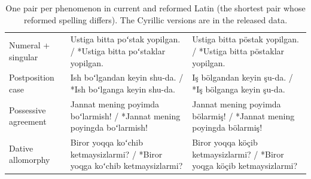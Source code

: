 \begin{table}[t]
\begin{tabular}{lp{6.6cm}p{6.6cm}}
Numeral + singular & Ustiga bitta poʻstak yopilgan. / *Ustiga bitta poʻstaklar yopilgan. & Ustiga bitta pöstak yopilgan. / *Ustiga bitta pöstaklar yopilgan. \\
Postposition case & Ish boʻlgandan keyin shu-da. / *Ish boʻlganga keyin shu-da. & Iş bölgandan keyin şu-da. / *Iş bölganga keyin şu-da. \\
Possessive agreement & Jannat mening poyimda boʻlarmish! / *Jannat mening poyingda boʻlarmish! & Jannat mening poyimda bölarmiş! / *Jannat mening poyingda bölarmiş! \\
Dative allomorphy & Biror yoqqa koʻchib ketmaysizlarmi? / *Biror yoqga koʻchib ketmaysizlarmi? & Biror yoqqa köçib ketmaysizlarmi? / *Biror yoqga köçib ketmaysizlarmi? \\
\bottomrule
\end{tabular}
\caption{One pair per phenomenon in current and reformed Latin (the shortest pair whose reformed spelling differs). The Cyrillic versions are in the released data.}
\label{tab:examples}
\end{table}
